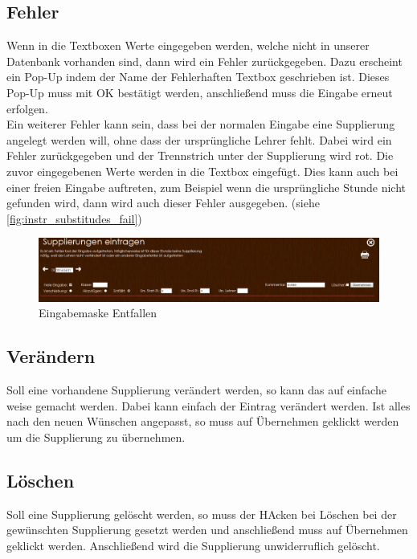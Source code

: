 \subsection{Fehler}
Wenn in die Textboxen Werte eingegeben werden, welche nicht in unserer Datenbank vorhanden sind, dann wird ein Fehler zurückgegeben. Dazu erscheint ein Pop-Up indem der Name der Fehlerhaften Textbox geschrieben ist. Dieses Pop-Up muss mit OK bestätigt werden, anschließend muss die Eingabe erneut erfolgen.\\
Ein weiterer Fehler kann sein, dass bei der normalen Eingabe eine Supplierung angelegt werden will, ohne dass der ursprüngliche Lehrer fehlt. Dabei wird ein Fehler zurückgegeben und der Trennstrich unter der Supplierung wird rot. Die zuvor eingegebenen Werte werden in die Textbox eingefügt. Dies kann auch bei einer freien Eingabe auftreten, zum Beispiel wenn die ursprüngliche Stunde nicht gefunden wird, dann wird auch dieser Fehler ausgegeben. (siehe \autoref{fig:instr_substitudes_fail})
\begin{figure}[H]
\centering
\includegraphics[keepaspectratio=true, width=17cm]{images/screenshots/substitudes_fail.png}
\caption{Eingabemaske Entfallen}
\label{fig:instr_substitudes_fail}
\end{figure}
\subsection{Verändern}
Soll eine vorhandene Supplierung verändert werden, so kann das auf einfache weise gemacht werden. Dabei kann einfach der Eintrag verändert werden. Ist alles nach den neuen Wünschen angepasst, so muss auf Übernehmen geklickt werden um die Supplierung zu übernehmen.
\subsection{Löschen}
Soll eine Supplierung gelöscht werden, so muss der HAcken bei Löschen bei der gewünschten Supplierung gesetzt werden und anschließend muss auf Übernehmen geklickt werden. Anschließend wird die Supplierung unwiderruflich gelöscht.